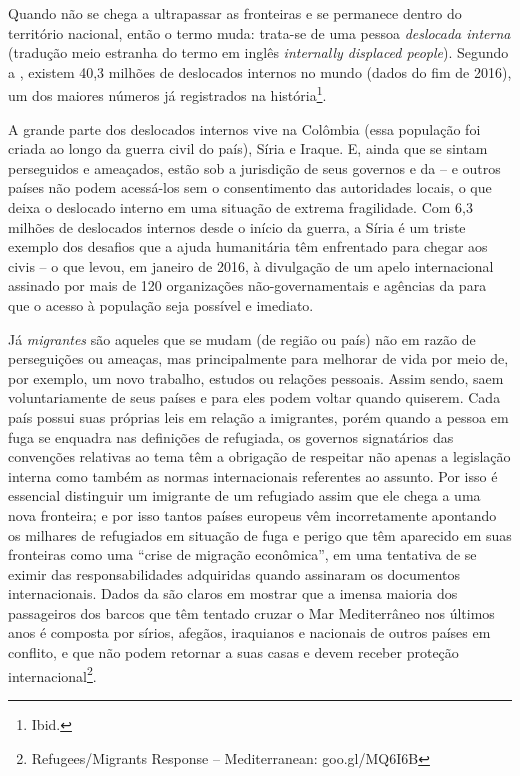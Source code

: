 Quando não se chega a ultrapassar as fronteiras e se permanece dentro do
território nacional, então o termo muda: trata-se de uma pessoa
\textit{deslocada interna} (tradução meio estranha do termo em inglês
\emph{internally displaced people}). Segundo a , existem 40,3 milhões
de deslocados internos no mundo (dados do fim de 2016), um dos maiores números
já registrados na história\footnote{Ibid.}. 

A grande parte dos deslocados internos
vive na Colômbia (essa população foi criada ao longo da guerra civil do
país), Síria e Iraque. E, ainda que se sintam perseguidos e ameaçados,
estão sob a jurisdição de seus governos e da  -- e outros países
não podem acessá-los sem o consentimento das autoridades locais, o que
deixa o deslocado interno em uma situação de extrema fragilidade. Com
6,3 milhões de deslocados internos desde o início da guerra, a Síria é
um triste exemplo dos desafios que a ajuda humanitária têm enfrentado
para chegar aos civis -- o que levou, em janeiro de 2016, à divulgação
de um apelo internacional assinado por mais de 120 organizações
não-governamentais e agências da  para que o acesso à população seja
possível e imediato.

Já \textit{migrantes} são aqueles que se mudam (de região ou país) não
em razão de perseguições ou ameaças, mas principalmente para melhorar de
vida por meio de, por exemplo, um novo trabalho, estudos ou relações
pessoais. Assim sendo, saem voluntariamente de seus países e para eles
podem voltar quando quiserem. Cada país possui suas próprias leis em
relação a imigrantes, porém quando a pessoa em fuga se enquadra nas
definições de refugiada, os governos signatários das convenções relativas
ao tema têm a obrigação de respeitar não apenas a legislação interna
como também as normas internacionais referentes ao assunto. Por isso é
essencial distinguir um imigrante de um refugiado assim que ele chega a
uma nova fronteira; e por isso tantos países europeus vêm incorretamente
apontando os milhares de refugiados em situação de fuga e perigo que têm
aparecido em suas fronteiras como uma ``crise de migração econômica'',
em uma tentativa de se eximir das responsabilidades adquiridas quando
assinaram os documentos internacionais. Dados da  são claros em
mostrar que a imensa maioria dos passageiros dos barcos que têm tentado
cruzar o Mar Mediterrâneo nos últimos anos é composta por sírios,
afegãos, iraquianos e nacionais de outros países em conflito, e que não
podem retornar a suas casas e devem receber proteção internacional\footnote{Refugees/Migrants Response -- 
Mediterranean: goo.gl/MQ6I6B}.




